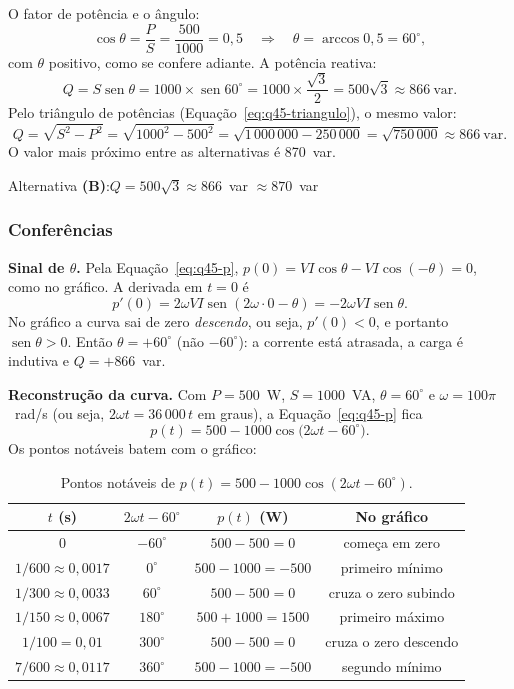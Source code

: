 \documentclass[a4paper,11pt]{article}
\providecommand{\sen}{\operatorname{sen}}   %
\numberwithin{equation}{section}
\numberwithin{figure}{section}
\numberwithin{table}{section}
\newcommand{\passo}[1]{{\color{blue_theme}\bfseries #1}\enspace}
\begin{document}
O fator de potência e o ângulo:
\[
  \cos\theta = \frac{P}{S} = \frac{500}{1000} = 0{,}5
  \quad\Longrightarrow\quad
  \theta = \arccos 0{,}5 = 60^\circ ,
\]
com $\theta$ positivo, como se confere adiante. A potência reativa:
\[
  Q = S\sen\theta = 1000 \times \sen 60^\circ
    = 1000 \times \frac{\sqrt{3}}{2}
    = 500\sqrt{3} \approx 866~\text{var}.
\]
Pelo triângulo de potências (Equação~\eqref{eq:q45-triangulo}), o mesmo
valor:
\[
  Q = \sqrt{S^2 - P^2} = \sqrt{1000^2 - 500^2}
    = \sqrt{1\,000\,000 - 250\,000} = \sqrt{750\,000} \approx 866~\text{var}.
\]
O valor mais próximo entre as alternativas é 870~var.

\begin{resposta}
  \centering
  Alternativa \textbf{(B)}:\quad $Q = 500\sqrt{3} \approx 866$~var $\approx
  870$~var
\end{resposta}

\subsubsection{Conferências}

\passo{Sinal de $\theta$.} Pela Equação~\eqref{eq:q45-p}, $p(0) = VI\cos\theta
- VI\cos(-\theta) = 0$, como no gráfico. A derivada em $t = 0$ é
\[
  p'(0) = 2\omega VI\sen(2\omega\cdot 0 - \theta) = -2\omega VI\sen\theta .
\]
No gráfico a curva sai de zero \emph{descendo}, ou seja, $p'(0) < 0$, e
portanto $\sen\theta > 0$. Então $\theta = +60^\circ$ (não $-60^\circ$): a
corrente está atrasada, a carga é indutiva e $Q = +866$~var.

\passo{Reconstrução da curva.} Com $P = 500$~W, $S = 1000$~VA, $\theta =
60^\circ$ e $\omega = 100\pi$~rad/s (ou seja, $2\omega t = 36\,000\,t$ em
graus), a Equação~\eqref{eq:q45-p} fica
\[
  p(t) = 500 - 1000\cos\bigl(2\omega t - 60^\circ\bigr).
\]
Os pontos notáveis batem com o gráfico:

\begin{table}[H]
  \centering
  \begin{tabular}{@{}cccc@{}}
    \toprule
    $t$ (s) & $2\omega t - 60^\circ$ & $p(t)$ (W) & No gráfico \\
    \midrule
    $0$                        & $-60^\circ$  & $500 - 500 = 0$       & começa em zero \\
    $1/600 \approx 0{,}0017$   & $0^\circ$    & $500 - 1000 = -500$   & primeiro mínimo \\
    $1/300 \approx 0{,}0033$   & $60^\circ$   & $500 - 500 = 0$       & cruza o zero subindo \\
    $1/150 \approx 0{,}0067$   & $180^\circ$  & $500 + 1000 = 1500$   & primeiro máximo \\
    $1/100 = 0{,}01$           & $300^\circ$  & $500 - 500 = 0$       & cruza o zero descendo \\
    $7/600 \approx 0{,}0117$   & $360^\circ$  & $500 - 1000 = -500$   & segundo mínimo \\
    \bottomrule
  \end{tabular}
  \caption{Pontos notáveis de $p(t) = 500 - 1000\cos(2\omega t - 60^\circ)$.}
  \label{tab:q45-pontos}
\end{table}
\end{document}
